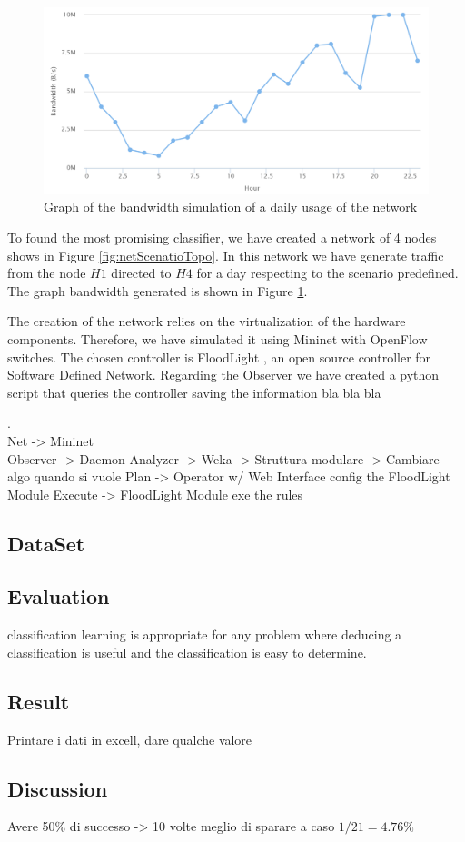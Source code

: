 \documentclass[12pt]{article}
\begin{document}
\begin{figure}[h!]
	\centering
	\includegraphics[width=1\textwidth]{img/networkScenario.png}
	\caption[]
	{Graph of the bandwidth simulation of a daily usage of the network}
	\label{fig:netScenarioConf}
\end{figure}


To found the most promising classifier, we have created a network of 4 nodes shows in Figure \ref{fig:netScenatioTopo}.
In this network we have generate traffic from the node $H1$ directed to $H4$ for a day respecting to the scenario predefined. The graph bandwidth generated is shown in Figure \ref{fig:netScenarioConf}.

The creation of the network relies on the virtualization of the hardware components.
Therefore, we have simulated it using Mininet \cite{mininet} with OpenFlow \cite{openflow} switches.
The chosen controller is FloodLight \cite{floodlight}, an open source controller for Software Defined Network.
Regarding the Observer we have created a python script that queries the controller saving the information bla bla bla

.\\



Net -> Mininet\\
Observer -> Daemon
Analyzer -> Weka -> Struttura modulare -> Cambiare algo quando si vuole
Plan -> Operator w/ Web Interface config the FloodLight Module
Execute -> FloodLight Module exe the rules
\subsection{DataSet}
\subsection{Evaluation}
classification learning is appropriate for any problem where deducing a classification is useful and the classification is easy to determine.
\subsection{Result}
Printare i dati in excell, dare qualche valore
\subsection{Discussion}
Avere 50\% di successo -> 10 volte meglio di sparare a caso $1/21 = 4.76\%$

\printbibliography 

	
\end{document}
